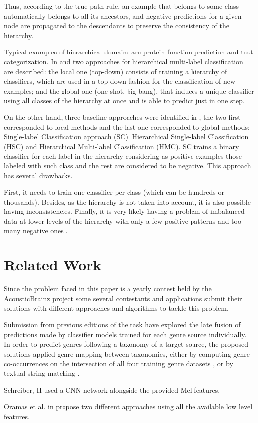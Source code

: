 Thus, according to the true path rule, an example that belongs to some class automatically belongs to all its ancestors,
and negative predictions for a given node are propagated to the descendants to
preserve the consistency of the hierarchy. 

Typical examples of hierarchical domains
are protein function prediction and text categorization.
In \cite{Cerri2012} and \cite{Silla2011} two approaches for hierarchical multi-label classification are
described: the local one (top-down) consists of training a hierarchy of classifiers, which are used in a top-down fashion for the classification of new examples; and the global one (one-shot, big-bang), that induces
a unique classifier using all classes of the hierarchy at once and is able to predict just in one step. 

On the other hand, three baseline approaches were identified in \cite{Vens2008}, the two first corresponded to local methods and the last one corresponded
to global methods: Single-label Classification approach (SC), Hierarchical Single-label Classification (HSC) and Hierarchical Multi-label Classification (HMC).
SC trains a binary classifier for each label in the hierarchy considering as
positive examples those labeled with such class and the rest are considered to be
negative. This approach has several drawbacks. 

First, it needs to train one classifier per class (which can be hundreds or thousands). 
Besides, as the hierarchy is not taken into account, it is also possible having inconsistencies. 
Finally, it is very likely having a problem of imbalanced data at lower levels of the hierarchy with only a few positive patterns and too many negative ones \cite{Gibaja2014}.



\section{Related Work}

Since the problem faced in this paper is a yearly contest held by the AcousticBrainz project \cite{genretask} 
some several contestants and applications submit their solutions with different approaches and algorithms to tackle this problem.

Submission from previous editions of the task have explored the late fusion of predictions made by classifier models trained for each genre
source individually. In order to predict genres following a taxonomy
of a target source, the proposed solutions applied genre mapping
between taxonomies, either by computing genre co-occurrences on
the intersection of all four training genre datasets \cite{koutinimediaeval}, or by textual
string matching \cite{Murauer2017}.

Schreiber, H \cite{schreiber2018mediaeval} used a CNN network alongside the provided Mel features.

Oramas et al. in \cite{oramas2018mediaeval} propose two different approaches using all the available low level features.

